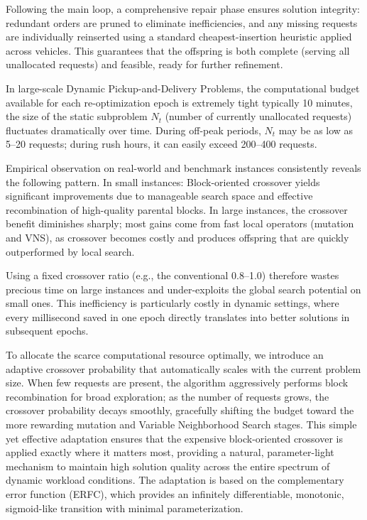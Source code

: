 \documentclass[]{interact}
\begin{document}
Following the main loop, a comprehensive repair phase ensures solution integrity: redundant orders are pruned to eliminate inefficiencies, and any missing requests are individually reinserted using a standard cheapest-insertion heuristic applied across vehicles. This guarantees that the offspring is both complete (serving all unallocated requests) and feasible, ready for further refinement.

In large-scale Dynamic Pickup-and-Delivery Problems, the computational budget available for each re-optimization epoch is extremely tight typically 10 minutes, the size of the static subproblem \(N_t\) (number of currently unallocated requests) fluctuates dramatically over time. During off-peak periods, \(N_t\) may be as low as 5–20 requests; during rush hours, it can easily exceed 200–400 requests.

Empirical observation on real-world and benchmark instances consistently reveals the following pattern.
In small instances: Block-oriented crossover yields significant improvements due to manageable search space and effective recombination of high-quality parental blocks. In large instances, the crossover benefit diminishes sharply; most gains come from fast local operators (mutation and VNS), as crossover becomes costly and produces offspring that are quickly outperformed by local search.

Using a fixed crossover ratio (e.g., the conventional 0.8–1.0) therefore wastes precious time on large instances and under-exploits the global search potential on small ones. This inefficiency is particularly costly in dynamic settings, where every millisecond saved in one epoch directly translates into better solutions in subsequent epochs.

To allocate the scarce computational resource optimally, we introduce an adaptive crossover probability that automatically scales with the current problem size. When few requests are present, the algorithm aggressively performs block recombination for broad exploration; as the number of requests grows, the crossover probability decays smoothly, gracefully shifting the budget toward the more rewarding mutation and Variable Neighborhood Search stages. This simple yet effective adaptation ensures that the expensive block-oriented crossover is applied exactly where it matters most, providing a natural, parameter-light mechanism to maintain high solution quality across the entire spectrum of dynamic workload conditions. The adaptation is based on the complementary error function (ERFC), which provides an infinitely differentiable, monotonic, sigmoid-like transition with minimal parameterization.
\end{document}
